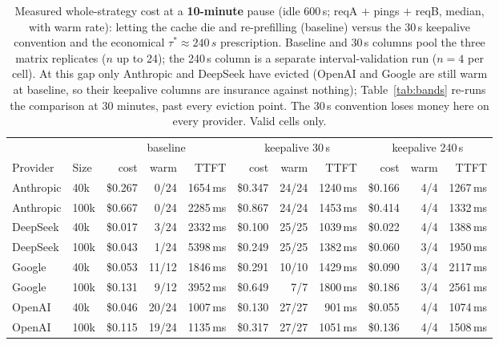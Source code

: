 \begin{table}[t]
\centering\footnotesize
\caption{Measured whole-strategy cost at a \textbf{10-minute} pause (idle $600$\,s; reqA $+$ pings $+$ reqB, median, with warm rate): letting the cache die and re-prefilling (baseline) versus the 30\,s keepalive convention and the economical $\tau^{\ast}\approx 240\,s$ prescription. Baseline and 30\,s columns pool the three matrix replicates ($n$ up to 24); the 240\,s column is a separate interval-validation run ($n{=}4$ per cell). At this gap only Anthropic and DeepSeek have evicted (OpenAI and Google are still warm at baseline, so their keepalive columns are insurance against nothing); Table~\ref{tab:bands} re-runs the comparison at 30 minutes, past every eviction point. The 30\,s convention loses money here on every provider. Valid cells only.}
\label{tab:strategy}
\begin{tabular}{ll rrr rrr rrr}
\toprule
 & & \multicolumn{3}{c}{baseline} & \multicolumn{3}{c}{keepalive 30\,s} & \multicolumn{3}{c}{keepalive 240\,s} \\
\cmidrule(lr){3-5}\cmidrule(lr){6-8}\cmidrule(lr){9-11}
Provider & Size & cost & warm & TTFT & cost & warm & TTFT & cost & warm & TTFT \\
\midrule
Anthropic & 40k & \$0.267 & 0/24 & 1654\,ms & \$0.347 & 24/24 & 1240\,ms & \$0.166 & 4/4 & 1267\,ms \\
Anthropic & 100k & \$0.667 & 0/24 & 2285\,ms & \$0.867 & 24/24 & 1453\,ms & \$0.414 & 4/4 & 1332\,ms \\
DeepSeek & 40k & \$0.017 & 3/24 & 2332\,ms & \$0.100 & 25/25 & 1039\,ms & \$0.022 & 4/4 & 1388\,ms \\
DeepSeek & 100k & \$0.043 & 1/24 & 5398\,ms & \$0.249 & 25/25 & 1382\,ms & \$0.060 & 3/4 & 1950\,ms \\
Google & 40k & \$0.053 & 11/12 & 1846\,ms & \$0.291 & 10/10 & 1429\,ms & \$0.090 & 3/4 & 2117\,ms \\
Google & 100k & \$0.131 & 9/12 & 3952\,ms & \$0.649 & 7/7 & 1800\,ms & \$0.186 & 3/4 & 2561\,ms \\
OpenAI & 40k & \$0.046 & 20/24 & 1007\,ms & \$0.130 & 27/27 & 901\,ms & \$0.055 & 4/4 & 1074\,ms \\
OpenAI & 100k & \$0.115 & 19/24 & 1135\,ms & \$0.317 & 27/27 & 1051\,ms & \$0.136 & 4/4 & 1508\,ms \\
\bottomrule
\end{tabular}
\end{table}
